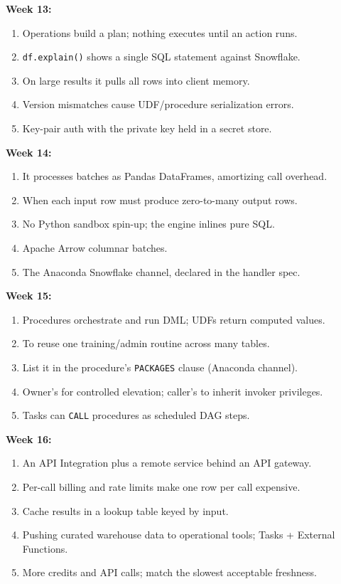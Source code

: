 \documentclass[11pt, a4paper]{article}
\begin{document}
\noindent\textbf{Week 13:}
\begin{enumerate}[nosep, leftmargin=6mm]
    \item Operations build a plan; nothing executes until an action runs.
    \item \texttt{df.explain()} shows a single SQL statement against Snowflake.
    \item On large results it pulls all rows into client memory.
    \item Version mismatches cause UDF/procedure serialization errors.
    \item Key-pair auth with the private key held in a secret store.
\end{enumerate}
\noindent\textbf{Week 14:}
\begin{enumerate}[nosep, leftmargin=6mm]
    \item It processes batches as Pandas DataFrames, amortizing call overhead.
    \item When each input row must produce zero-to-many output rows.
    \item No Python sandbox spin-up; the engine inlines pure SQL.
    \item Apache Arrow columnar batches.
    \item The Anaconda Snowflake channel, declared in the handler spec.
\end{enumerate}
\noindent\textbf{Week 15:}
\begin{enumerate}[nosep, leftmargin=6mm]
    \item Procedures orchestrate and run DML; UDFs return computed values.
    \item To reuse one training/admin routine across many tables.
    \item List it in the procedure's \texttt{PACKAGES} clause (Anaconda channel).
    \item Owner's for controlled elevation; caller's to inherit invoker privileges.
    \item Tasks can \texttt{CALL} procedures as scheduled DAG steps.
\end{enumerate}
\noindent\textbf{Week 16:}
\begin{enumerate}[nosep, leftmargin=6mm]
    \item An API Integration plus a remote service behind an API gateway.
    \item Per-call billing and rate limits make one row per call expensive.
    \item Cache results in a lookup table keyed by input.
    \item Pushing curated warehouse data to operational tools; Tasks + External Functions.
    \item More credits and API calls; match the slowest acceptable freshness.
\end{enumerate}
\end{document}
